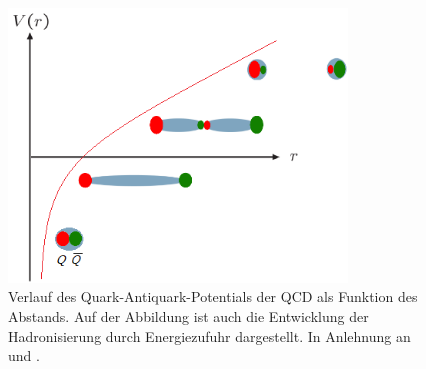 \documentclass[12pt,a4paper]{report}
\begin{document}
\begin{figure}[tb!]
\centering
\includegraphics[width=9cm]{Potential.png}  
\caption{Verlauf des Quark-Antiquark-Potentials der QCD als Funktion des Abstands. Auf der Abbildung ist auch die Entwicklung der Hadronisierung durch Energiezufuhr dargestellt. In Anlehnung an \cite{krugermean2} und \cite{Chernodub:2010bi}.}
\label{Potential}
\end{figure}
\end{document}
